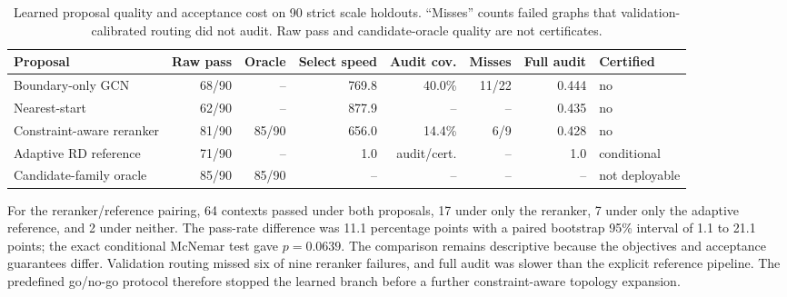 \documentclass[10pt]{article}
\begin{document}
\begin{table}[H]
\centering
\caption{Learned proposal quality and acceptance cost on 90 strict scale
holdouts. ``Misses'' counts failed graphs that validation-calibrated routing did
not audit. Raw pass and candidate-oracle quality are not certificates.}
\label{tab:learned-ablation}
\footnotesize
\begin{tabular}{lrrrrrrl}
\toprule
Proposal & Raw pass & Oracle & Select speed & Audit cov. & Misses & Full audit & Certified\\
\midrule
Boundary-only GCN & 68/90 & -- & 769.8 & 40.0\% & 11/22 & 0.444 & no\\
Nearest-start & 62/90 & -- & 877.9 & -- & -- & 0.435 & no\\
Constraint-aware reranker & 81/90 & 85/90 & 656.0 & 14.4\% & 6/9 & 0.428 & no\\
Adaptive RD reference & 71/90 & -- & 1.0 & audit/cert. & -- & 1.0 & conditional\\
Candidate-family oracle & 85/90 & 85/90 & -- & -- & -- & -- & not deployable\\
\bottomrule
\end{tabular}
\end{table}

For the reranker/reference pairing, 64 contexts passed under both proposals, 17
under only the reranker, 7 under only the adaptive reference, and 2 under
neither. The pass-rate difference was 11.1 percentage points with a paired
bootstrap 95\% interval of 1.1 to 21.1 points; the exact conditional McNemar
test gave $p=0.0639$. The comparison remains descriptive because the objectives
and acceptance guarantees differ. Validation routing missed six of nine
reranker failures, and full audit was slower than the explicit reference
pipeline. The predefined go/no-go protocol therefore stopped the learned branch
before a further constraint-aware topology expansion.

\begingroup
\small
\setlength{\bibsep}{1pt}


\endgroup
\end{document}
